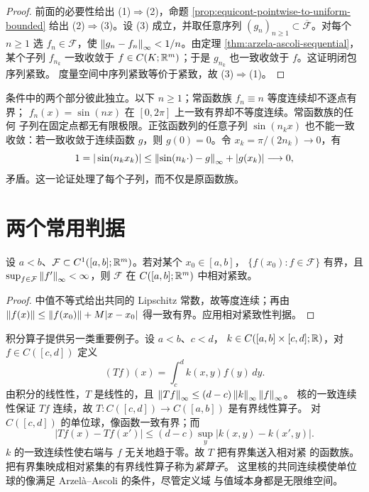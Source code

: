 \begin{proof}
前面的必要性给出 (1)$\Rightarrow$(2)，命题
\ref{prop:equicont-pointwise-to-uniform-bounded} 给出
(2)$\Rightarrow$(3)。设 (3) 成立，并取任意序列
$(g_n)_{n\ge1}\subset\overline{\mathcal F}$。对每个 $n\ge1$ 选
$f_n\in\mathcal F$，使 $\left\lVert g_n-f_n\right\rVert_\infty<1/n$。由定理
\ref{thm:arzela-ascoli-sequential}，某个子列 $f_{n_k}$ 一致收敛于
$f\in C(K;\mathbb{R}^m)$；于是 $g_{n_k}$ 也一致收敛于 $f$。这证明闭包序列紧致。
度量空间中序列紧致等价于紧致，故 (3)$\Rightarrow$(1)。
\end{proof}

条件中的两个部分彼此独立。以下 $n\ge1$；常函数族 $f_n\equiv n$ 等度连续却不逐点有界；
$f_n(x)=\sin(nx)$ 在 $[0,2\pi]$ 上一致有界却不等度连续。常函数族的任何
子列在固定点都无有限极限。正弦函数列的任意子列 $\sin(n_kx)$ 也不能一致
收敛：若一致收敛于连续函数 $g$，则 $g(0)=0$。令
$x_k=\pi/(2n_k)\to0$，有
\[
 1=|\sin(n_kx_k)|
 \le\left\lVert\sin(n_k\cdot)-g\right\rVert_\infty+|g(x_k)|\longrightarrow0,
\]
矛盾。这一论证处理了每个子列，而不仅是原函数族。

\section{两个常用判据}

\begin{corollary}[导数有界的函数族]
\label{cor:bounded-derivative-ascoli}
设 $a<b$、$\mathcal F\subset C^1([a,b];\mathbb{R}^m)$。若对某个 $x_0\in[a,b]$，
$\{f(x_0):f\in\mathcal F\}$ 有界，且
$\sup_{f\in\mathcal F}\left\lVert f'\right\rVert_\infty<\infty$，则 $\mathcal F$ 在
$C([a,b];\mathbb{R}^m)$ 中相对紧致。
\end{corollary}

\begin{proof}
中值不等式给出共同的 Lipschitz 常数，故等度连续；再由
$\left\lVert f(x)\right\rVert\le\left\lVert f(x_0)\right\rVert+M|x-x_0|$ 得一致有界。应用相对紧致性判据。
\end{proof}

积分算子提供另一类重要例子。设 $a<b$、$c<d$，
$k\in C([a,b]\times[c,d];\mathbb{R})$，对 $f\in C([c,d])$ 定义
\[
 (Tf)(x)=\int_c^d k(x,y)f(y)\,dy.
\]
由积分的线性性，$T$ 是线性的，且
$\left\lVert Tf\right\rVert_\infty\le(d-c)\left\lVert k\right\rVert_\infty\left\lVert f\right\rVert_\infty$。
核的一致连续性保证 $Tf$ 连续，故 $T:C([c,d])\to C([a,b])$ 是有界线性算子。
对 $C([c,d])$ 的单位球，像函数一致有界；而
\[
 |Tf(x)-Tf(x')|
 \le(d-c)\sup_y|k(x,y)-k(x',y)|.
\]
$k$ 的一致连续性使右端与 $f$ 无关地趋于零。故 $T$ 把有界集送入相对紧
的函数族。把有界集映成相对紧集的有界线性算子称为\emph{紧算子}。
这里核的共同连续模使单位球的像满足 Arzelà--Ascoli 的条件，尽管定义域
与值域本身都是无限维空间。

